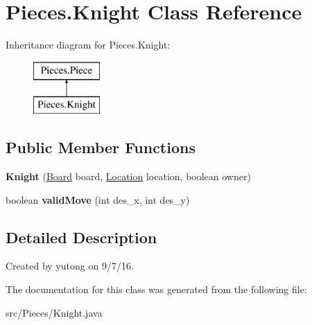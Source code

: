 \hypertarget{classMain_1_1Knight}{\section{Pieces.\-Knight Class Reference}
\label{classMain_1_1Knight}
}
Inheritance diagram for Pieces.\-Knight\-:\begin{figure}[H]
\begin{center}
\leavevmode
\includegraphics[height=2.000000cm]{classMain_1_1Knight}
\end{center}
\end{figure}
\subsection*{Public Member Functions}
\begin{DoxyCompactItemize}
\item 
\hypertarget{classMain_1_1Knight_ae02be90f6445e20fdc1619abdc713529}{{\bfseries Knight} (\hyperlink{classMain_1_1Board}{Board} board, \hyperlink{classMain_1_1Location}{Location} location, boolean owner)}\label{classMain_1_1Knight_ae02be90f6445e20fdc1619abdc713529}

\item 
\hypertarget{classMain_1_1Knight_a4b73b18a918b056d1c92c7bf10459fdc}{boolean {\bfseries valid\-Move} (int des\-\_\-x, int des\-\_\-y)}\label{classMain_1_1Knight_a4b73b18a918b056d1c92c7bf10459fdc}

\end{DoxyCompactItemize}


\subsection{Detailed Description}
Created by yutong on 9/7/16. 

The documentation for this class was generated from the following file\-:\begin{DoxyCompactItemize}
\item 
src/\-Pieces/Knight.\-java\end{DoxyCompactItemize}
